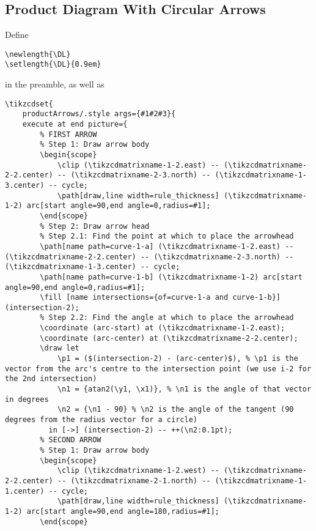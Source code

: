 \subsection{Product Diagram With Circular Arrows}\label{subsection-tikz-code-for-commutative-diagrams-product-diagram-with-circular-arrows}
Define
\begin{verbatim}
\newlength{\DL}
\setlength{\DL}{0.9em}
\end{verbatim}
in the preamble, as well as
\begin{verbatim}
\tikzcdset{
    productArrows/.style args={#1#2#3}{
    execute at end picture={
        % FIRST ARROW
        % Step 1: Draw arrow body
        \begin{scope}
            \clip (\tikzcdmatrixname-1-2.east) -- (\tikzcdmatrixname-2-2.center) -- (\tikzcdmatrixname-2-3.north) -- (\tikzcdmatrixname-1-3.center) -- cycle;
            \path[draw,line width=rule_thickness] (\tikzcdmatrixname-1-2) arc[start angle=90,end angle=0,radius=#1];
        \end{scope}
        % Step 2: Draw arrow head
        % Step 2.1: Find the point at which to place the arrowhead
        \path[name path=curve-1-a] (\tikzcdmatrixname-1-2.east) -- (\tikzcdmatrixname-2-2.center) -- (\tikzcdmatrixname-2-3.north) -- (\tikzcdmatrixname-1-3.center) -- cycle;
        \path[name path=curve-1-b] (\tikzcdmatrixname-1-2) arc[start angle=90,end angle=0,radius=#1];
        \fill [name intersections={of=curve-1-a and curve-1-b}] (intersection-2);
        % Step 2.2: Find the angle at which to place the arrowhead
        \coordinate (arc-start) at (\tikzcdmatrixname-1-2.east);
        \coordinate (arc-center) at (\tikzcdmatrixname-2-2.center);
        \draw let
            \p1 = ($(intersection-2) - (arc-center)$), % \p1 is the vector from the arc's centre to the intersection point (we use i-2 for the 2nd intersection)
            \n1 = {atan2(\y1, \x1)}, % \n1 is the angle of that vector in degrees
            \n2 = {\n1 - 90} % \n2 is the angle of the tangent (90 degrees from the radius vector for a circle)
          in [->] (intersection-2) -- ++(\n2:0.1pt);
        % SECOND ARROW
        % Step 1: Draw arrow body
        \begin{scope}
            \clip (\tikzcdmatrixname-1-2.west) -- (\tikzcdmatrixname-2-2.center) -- (\tikzcdmatrixname-2-1.north) -- (\tikzcdmatrixname-1-1.center) -- cycle;
            \path[draw,line width=rule_thickness] (\tikzcdmatrixname-1-2) arc[start angle=90,end angle=180,radius=#1];
        \end{scope}

\end{verbatim}
